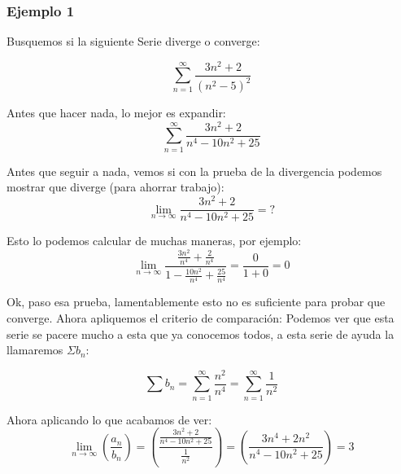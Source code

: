 \documentclass[12pt]{report}                                %
\begin{document}
        \subsubsection{Ejemplo 1}
            Busquemos si la siguiente Serie diverge o converge:

            \begin{equation*}
                \sum_{n=1}^{\infty} \frac{3n^2+2}{(n^2-5)^2}
            \end{equation*}

            Antes que hacer nada, lo mejor es expandir:
            \begin{equation*}
                \sum_{n=1}^{\infty} \frac{3n^2+2}{n^4-10n^2+25}
            \end{equation*}
             
            Antes que seguir a nada, vemos si con la prueba de la divergencia podemos mostrar que diverge
            (para ahorrar trabajo):
            \begin{equation*}
                \lim_{n \to \infty} \frac{3n^2+2}{n^4-10n^2+25} = ?
            \end{equation*}

            Esto lo podemos calcular de muchas maneras, por ejemplo:
            \begin{equation*}
                \lim_{n \to \infty} \frac{ \frac{3n^2}{n^4} +\frac{2}{n^4}  }{ 1 - \frac{10n^2}{n^4} + \frac{25}{n^4} } = \frac{0}{1+0} = 0
            \end{equation*}

            Ok, paso esa prueba, lamentablemente esto no es
            suficiente para probar que converge.
            Ahora apliquemos el criterio de comparación: Podemos ver que esta serie se pacere mucho a esta que ya conocemos todos, a esta serie de ayuda la llamaremos $\Sigma b_n$:

            \begin{equation*}
                \sum b_n = \sum_{n=1}^{\infty} \frac{n^2}{n^4} = \sum_{n=1}^{\infty} \frac{1}{n^2}
            \end{equation*}

            Ahora aplicando lo que acabamos de ver:
            \begin{equation*}
                \lim_{n \to \infty} \left( \frac{a_n}{b_n} \right) = \left( \frac{ \frac{3n^2+2}{n^4-10n^2+25} }{ \frac{1}{n^2} } \right) =  \left( \frac{3n^4+2n^2}{n^4-10n^2+25} \right) = 3
            \end{equation*}
\end{document}
